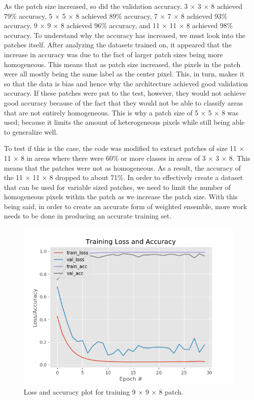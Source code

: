 \documentclass[letterpaper, 10 pt, conference]{ieeeconf}  %
\begin{document}
As the patch size increased, so did the validation accuracy. 3 $\times$ 3 $\times$ 8 achieved 79\% accuracy, 5 $\times$ 5 $\times$ 8 achieved 89\% accuracy, 7 $\times$ 7 $\times$ 8 achieved 93\% accuracy, 9 $\times$ 9 $\times$ 8 achieved 96\% accuracy, and 11 $\times$ 11 $\times$ 8 achieved 98\% accuracy. To understand why the accuracy has increased, we must look into the patches itself. After analyzing the datasets trained on, it appeared that the increase in accuracy was due to the fact of larger patch sizes being more homogeneous. This means that as patch size increased, the pixels in the patch were all mostly being the same label as the center pixel. This, in turn, makes it so that the data is bias and hence why the architecture achieved good validation accuracy. If these patches were put to the test, however, they would not achieve good accuracy because of the fact that they would not be able to classify areas that are not entirely homogeneous. This is why a patch size of 5 $\times$ 5 $\times$ 8 was used; because it limits the amount of heterogeneous pixels while still being able to generalize well.

To test if this is the case, the code was modified to extract patches of size 11 $\times$ 11 $\times$ 8 in areas where there were 60\% or more classes in areas of 3 $\times$ 3 $\times$ 8. This means that the patches were not as homogeneous. As a result, the accuracy of the 11 $\times$ 11 $\times$ 8 dropped to about 71\%. In order to effectively create a dataset that can be used for variable sized patches, we need to limit the number of homogeneous pixels within the patch as we increase the patch size. With this being said, in order to create an accurate form of weighted ensemble, more work needs to be done in producing an accurate training set.

\begin{figure}[htb]
	\centering
	\includegraphics[scale=0.6]{results_9dim.png}
	\caption{Loss and accuracy plot for training 9 $\times$ 9 $\times$ 8 patch.}
	\label{figurelabel}
\end{figure}
\end{document}
